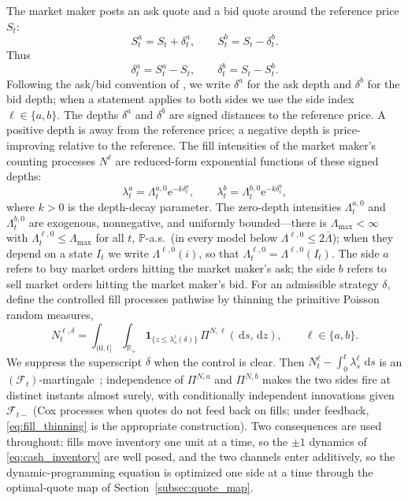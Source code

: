 \documentclass[11pt,a4paper]{article}
\newcommand{\Prob}{\mathbb{P}}
\newcommand{\R}{\mathbb{R}}
\newcommand{\Fcal}{\mathcal{F}}
\newcommand{\dd}{\,\mathrm{d}}
\newcommand{\e}{\mathrm e}
\theoremstyle{plain}
\theoremstyle{definition}
\begin{document}
The market maker posts an ask quote and a bid quote around the reference price
\(S_t\):
\[
S_t^a=S_t+\delta_t^a,\qquad S_t^b=S_t-\delta_t^b.
\]
Thus
\[
\delta_t^a=S_t^a-S_t,\qquad \delta_t^b=S_t-S_t^b.
\]
Following the ask/bid convention of \cite{GLFT2013,Gueant2017}, we write
\(\delta^a\) for the ask depth and \(\delta^b\) for the bid depth; when a
statement applies to both sides we use the side index \(\ell\in\{a,b\}\).  The
depths \(\delta^a\) and \(\delta^b\) are signed distances to the reference
price.  A positive depth is away from the reference price; a negative depth is
price-improving relative to the reference.  The fill intensities of the market
maker's counting processes \(N^\ell\) are reduced-form exponential functions of
these signed depths:
\begin{equation}
\lambda_t^a
=\Lambda_t^{a,0}\e^{-k\delta_t^a},
\qquad
\lambda_t^b
=\Lambda_t^{b,0}\e^{-k\delta_t^b},
\label{eq:generic_fill_intensities}
\end{equation}
where \(k>0\) is the depth-decay parameter.  The zero-depth intensities
\(\Lambda_t^{a,0}\) and \(\Lambda_t^{b,0}\) are exogenous, nonnegative, and
uniformly bounded---there is \(\Lambda_{\max}<\infty\) with
\(\Lambda_t^{\ell,0}\le\Lambda_{\max}\) for all \(t\), \(\Prob\)-a.s.\ (in
every model below \(\Lambda^{\ell,0}\le2\bar\Lambda\)); when they depend on a
state \(I_t\) we write \(\Lambda^{\ell,0}(i)\), so that
\(\Lambda_t^{\ell,0}=\Lambda^{\ell,0}(I_t)\).  The side \(a\)
refers to buy market orders hitting the market maker's ask; the side \(b\)
refers to sell market orders hitting the market maker's bid.  For an admissible
strategy \(\delta\), define the controlled fill processes pathwise by thinning
the primitive Poisson random measures,
\begin{equation}
N_t^{\ell,\delta}
=\int_{(0,t]}\!\int_{\R_+}
\mathbf 1_{\{z\le \lambda_s^\ell(\delta)\}}\,\Pi^{N,\ell}(\dd s,\dd z),
\qquad \ell\in\{a,b\}.
\label{eq:fill_thinning}
\end{equation}
We suppress the superscript \(\delta\) when the control is clear.  Then
\(N^\ell_t-\int_0^t\lambda_s^\ell\,\dd s\) is an
\((\Fcal_t)\)-martingale~\cite{Bremaud1981}; independence of \(\Pi^{N,a}\) and
\(\Pi^{N,b}\) makes the two sides fire at distinct instants almost surely, with
conditionally independent innovations given \(\Fcal_{t-}\) (Cox processes when
quotes do not feed back on fills; under feedback, \eqref{eq:fill_thinning} is
the appropriate construction).  Two consequences are used throughout: fills
move inventory one unit at a time, so the \(\pm1\) dynamics of
\eqref{eq:cash_inventory} are well posed, and the two channels enter
additively, so the dynamic-programming equation is optimized one side at a
time through the optimal-quote map of Section~\ref{subsec:quote_map}.
\end{document}
